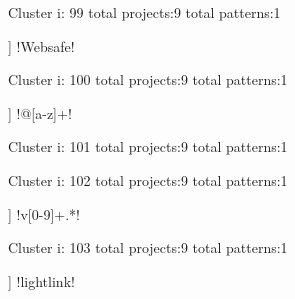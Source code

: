 Cluster i: 99
total projects:9
total patterns:1
\begin{multicols}{1}
\begin{description}[noitemsep,topsep=0pt]
\item [[9] ] \cverb!Websafe!
\end{description}
\end{multicols}







Cluster i: 100
total projects:9
total patterns:1
\begin{multicols}{1}
\begin{description}[noitemsep,topsep=0pt]
\item [[9] ] \cverb!@[a-z]+!
\end{description}
\end{multicols}







Cluster i: 101
total projects:9
total patterns:1
\begin{multicols}{1}
\end{multicols}







Cluster i: 102
total projects:9
total patterns:1
\begin{multicols}{1}
\begin{description}[noitemsep,topsep=0pt]
\item [[9] ] \cverb!v[0-9]+.*!
\end{description}
\end{multicols}







Cluster i: 103
total projects:9
total patterns:1
\begin{multicols}{1}
\begin{description}[noitemsep,topsep=0pt]
\item [[9] ] \cverb!lightlink!
\end{description}
\end{multicols}








